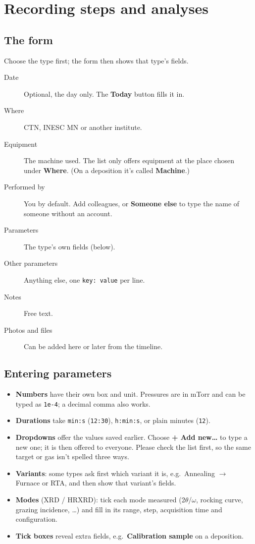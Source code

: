 \documentclass[11pt,a4paper]{article}
\newcommand{\ui}[1]{\textsf{\textbf{#1}}}
\begin{document}
\section{Recording steps and analyses}

\subsection{The form}

Choose the type first; the form then shows that type's fields.

\begin{description}
  \item[Date] Optional, the day only. The \ui{Today} button fills it in.
  \item[Where] CTN, INESC MN or another institute.
  \item[Equipment] The machine used. The list only offers equipment at the
    place chosen under \ui{Where}. (On a deposition it's called
    \ui{Machine}.)
  \item[Performed by] You by default. Add colleagues, or \ui{Someone else}
    to type the name of someone without an account.
  \item[Parameters] The type's own fields (below).
  \item[Other parameters] Anything else, one \texttt{key: value} per line.
  \item[Notes] Free text.
  \item[Photos and files] Can be added here or later from the timeline.
\end{description}

\subsection{Entering parameters}

\begin{itemize}
  \item \textbf{Numbers} have their own box and unit. Pressures are in mTorr
    and can be typed as \texttt{1e-4}; a decimal comma also works.
  \item \textbf{Durations} take \texttt{min:s} (\texttt{12:30}),
    \texttt{h:min:s}, or plain minutes (\texttt{12}).
  \item \textbf{Dropdowns} offer the values saved earlier. Choose
    \ui{+ Add new\ldots} to type a new one; it is then offered to everyone.
    Please check the list first, so the same target or gas isn't spelled
    three ways.
  \item \textbf{Variants}: some types ask first which variant it is, e.g.\
    Annealing $\to$ Furnace or RTA, and then show that variant's fields.
  \item \textbf{Modes} (XRD / HRXRD): tick each mode measured (2$\theta$/$\omega$,
    rocking curve, grazing incidence, \ldots) and fill in its range, step,
    acquisition time and configuration.
  \item \textbf{Tick boxes} reveal extra fields, e.g.\ \ui{Calibration sample}
    on a deposition.
\end{itemize}
\end{document}
